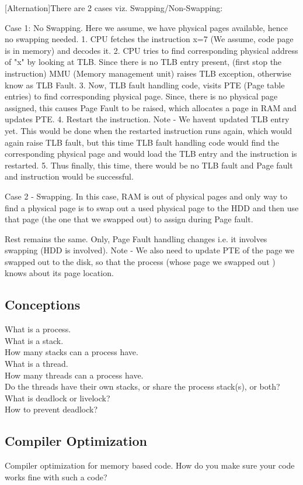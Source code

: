 [Alternation]There are 2 cases viz. Swapping/Non-Swapping: 

Case 1: No Swapping. 
Here we assume, we have physical pages available, hence no swapping needed. 
1. CPU fetches the instruction x=7 (We assume, code page is in memory) and decodes it. 
2. CPU tries to find corresponding physical address of "x" by looking at TLB. Since there is no TLB entry present, (first stop the instruction) MMU (Memory management unit) raises 
TLB exception, otherwise know as TLB Fault. 
3. Now, TLB fault handling code, visits PTE (Page table entries) to find corresponding physical page. Since, there is no physical page assigned, this causes Page Fault to be 
raised, which allocates a page in RAM and updates PTE. 
4. Restart the instruction. 
Note - We havent updated TLB entry yet. This would be done when the restarted instruction runs again, which would again raise TLB fault, but this time TLB fault handling code 
would find the corresponding physical page and would load the TLB entry and the instruction is restarted. 
5. Thus finally, this time, there would be no TLB fault and Page fault and instruction would be successful.

Case 2 - Swapping. 
In this case, RAM is out of physical pages and only way to find a physical page is to swap out a used physical page to the HDD and then use that page (the one that we swapped out) 
to assign during Page fault. 

Rest remains the same. Only, Page Fault handling changes i.e. it involves swapping (HDD is involved). Note - We also need to update PTE of the page we swapped out to the disk, so 
that the process (whose page we swapped out ) knows about its page location.

\subsection{Conceptions}
What is a process. \\
What is a stack. \\
How many stacks can a process have. \\
What is a thread. \\
How many threads can a process have. \\
Do the threads have their own stacks, or share the process stack(s), or both?\\
What is deadlock or livelock?\\
How to prevent deadlock?

\subsection{Compiler Optimization}
Compiler optimization for memory based code. How do you make sure your code works fine with such a code?

